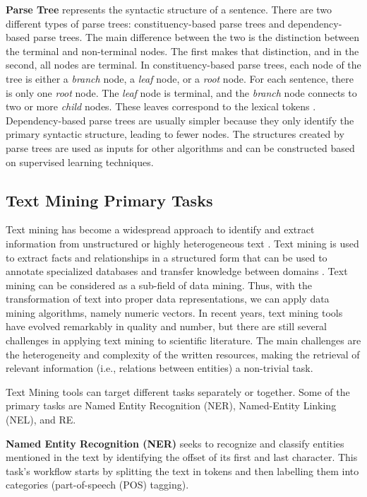 \textbf{Parse Tree} represents the syntactic structure of a sentence. There are two different types of parse trees: constituency-based parse trees and dependency-based parse trees. The main difference between the two is the distinction between the terminal and non-terminal nodes. The first makes that distinction, and in the second, all nodes are terminal. In constituency-based parse trees, each node of the tree is either a \textit{branch} node, a \textit{leaf} node, or a \textit{root} node. For each sentence, there is only one \textit{root} node. The \textit{leaf} node is terminal, and the \textit{branch} node connects to two or more \textit{child} nodes. These leaves correspond to the lexical tokens \citep{aho1986compilers}. 
Dependency-based parse trees are usually simpler because they only identify the primary syntactic structure, leading to fewer nodes. 
The structures created by parse trees are used as inputs for other algorithms and can be constructed based on supervised learning techniques.


\hypertarget{2.1.2}{\subsection{Text Mining Primary Tasks}}

Text mining has become a widespread approach to identify and extract information from unstructured or highly heterogeneous text \citep{westergaard2018comprehensive}. Text mining is used to extract facts and relationships in a structured form that can be used to annotate specialized databases and transfer knowledge between domains \citep{fleuren2015application}. Text mining can be considered as a sub-field of data mining. Thus, with the transformation of text into proper data representations, we can apply data mining algorithms, namely numeric vectors. In recent years, text mining tools have evolved remarkably in quality and number, but there are still several challenges in applying text mining to scientific literature. The main challenges are the heterogeneity and complexity of the written resources, making the retrieval of relevant information (i.e., relations between entities) a non-trivial task. 

Text Mining tools can target different tasks separately or together. Some of the primary tasks are Named Entity Recognition (NER), Named-Entity Linking (NEL), and RE. 

\textbf{Named Entity Recognition (NER)} seeks to recognize and classify entities mentioned in the text by identifying the offset of its first and last character. This task's workflow starts by splitting the text in tokens and then labelling them into categories (part-of-speech (POS) tagging).
    

